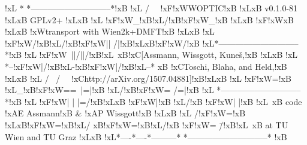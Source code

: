 !xL{}          *    *-----------------------------*!xB{}
!xL{}         / \    \ !xF{}!xW{}WOPTIC!xB{} !xL{}\!xB{} v0.1.0-81 !xL{}\!xB{} GPLv2+ !xL{}\!xB{}
!xL{}       !xF{}!xW{}_!xB{}!xL{}/!xB{}!xF{}!xW{}_!xB{}  !xL{}\!xB{} !xF{}!xW{}\!xB{}  !xL{}\!xB{} !xW{}transport with  Wien2k+DMFT!xB{} !xL{}\!xB{}
!xL{}      !xF{}!xW{}/!xB{}!xL{}/!xB{}!xF{}!xW{}|| /|!xB{}!xL{}\!xB{}!xF{}!xW{}/!xB{}   !xL{}*-----------------------------*!xB{}
!xL{}      !xF{}!xW{}\ ||/||/!xB{}!xL{}\    \!xB{}!xC{}[Assmann,  Wissgott,  Kuneš,!xB{} !xL{}\!xB{}
!xL{}     *--!xF{}!xW{}|/!xB{}!xL{}-!xB{}!xF{}!xW{}|/!xB{}!xL{}--*    \!xB{} !xC{}Toschi,  Blaha,  and  Held,!xB{} !xL{}\!xB{}
!xL{}    / \       / \    \ !xC{}http://arXiv.org/1507.04881]!xB{}!xL{}\!xB{}
!xL{}  !xF{}!xW{}=!xB{} !xL{}_!xB{}!xF{}!xW{}==\ |=|!xB{} !xL{}/!xB{}!xF{}!xW{}= /=|!xB{}  !xL{} *-----------------------------*!xB{}
!xL{} !xF{}!xW{}| | |=/!xB{}!xL{}\!xB{} !xF{}!xW{}|!xB{} !xL{}/!xB{} !xF{}!xW{}| |!xB{} !xL{}\    \!xB{} code !xA{}E Assmann!xB{} & !xA{}P Wissgott!xB{} !xL{}\!xB{}
!xL{} /!xF{}!xW{}=!xB{} !xL{}\!xB{}!xF{}!xW{}=!xB{}!xL{}/  \!xB{}!xF{}!xW{}=!xB{}!xL{}/!xB{}  !xF{}!xW{}= \=/!xB{}!xL{}\    \!xB{} at  TU  Wien  and  TU  Graz !xL{}\!xB{}
!xL{}*----*----*---------*    *-----------------------------*  !xB{}
